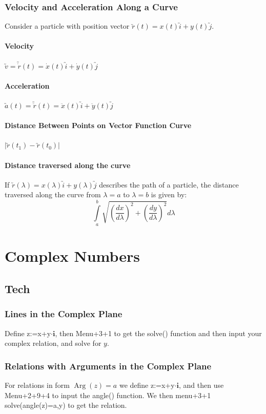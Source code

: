 \documentclass[a4paper,twoside,10pt]{article}
\DeclareMathOperator\Arg{Arg}
\begin{document}
			\subsubsection{Velocity and Acceleration Along a Curve}
				Consider a particle with position vector $\utilde{r}(t)=x(t)\utilde{i}+y(t)\utilde{j}$.
				\paragraph{Velocity} $\utilde{v}=\utilde{\dot{r}}(t)=\dot{x}(t)\utilde{i}+\dot{y}(t)\utilde{j}$
				\paragraph{Acceleration} $\utilde{a}(t)=\utilde{\ddot{r}}(t)=\ddot{x}(t)\utilde{i}+\ddot{y}(t)\utilde{j}$
				\paragraph{Distance Between Points on Vector Function Curve} $|\utilde{r}(t_1)-\utilde{r}(t_0)|$
				\paragraph{Distance traversed along the curve} If $\utilde{r}(\lambda)=x(\lambda)\utilde{i}+y(\lambda)\utilde{j}$ describes the path of a particle, the distance traversed along the curve from $\lambda=a$ to $\lambda=b$ is given by:
				\[
					\int\limits_a^b\sqrt{\left(\frac{dx}{d\lambda}\right)^2+\left(\frac{dy}{d\lambda}\right)^2}d\lambda
				\]
	\section{Complex Numbers}
		\subsection{Tech}
			\subsubsection{Lines in the Complex Plane} Define z:=x+y$\cdot\mathbf{i}$, then Menu+3+1 to get the solve() function and then input your complex relation, and solve for $y$.
			
			\subsubsection{Relations with Arguments in the Complex Plane} For relations in form $\Arg(z)=a$ we define z:=x+y$\cdot\mathbf{i}$, and then use Menu+2+9+4 to input the angle() function. We then menu+3+1 solve(angle(z)=a,y) to get the relation.
\end{document}
